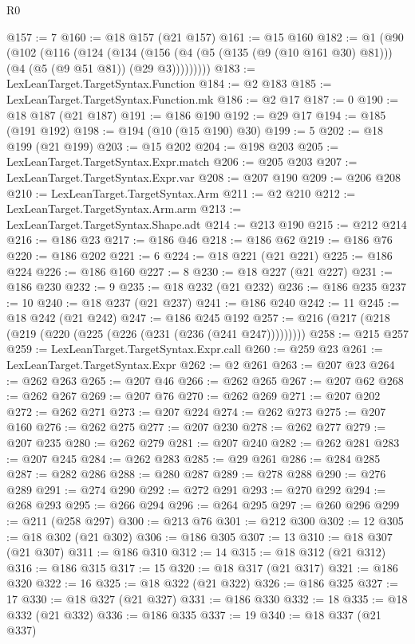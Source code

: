 \begin{lexlean}{R0}
\begin{coremodule}
@157 := 7
@160 := @18 @157 (@21 @157)
@161 := @15 @160
@182 := @1
    (@90
      (@102
        (@116
          (@124
            (@134
              (@156 (@4 (@5 (@135 (@9 (@10 @161 @30) @81))) (@4 (@5 (@9 @51 @81)) (@29 @3)))))))))
@183 := LexLeanTarget.TargetSyntax.Function
@184 := @2 @183
@185 := LexLeanTarget.TargetSyntax.Function.mk
@186 := @2 @17
@187 := 0
@190 := @18 @187 (@21 @187)
@191 := @186 @190
@192 := @29 @17
@194 := @185 (@191 @192)
@198 := @194 (@10 (@15 @190) @30)
@199 := 5
@202 := @18 @199 (@21 @199)
@203 := @15 @202
@204 := @198 @203
@205 := LexLeanTarget.TargetSyntax.Expr.match
@206 := @205 @203
@207 := LexLeanTarget.TargetSyntax.Expr.var
@208 := @207 @190
@209 := @206 @208
@210 := LexLeanTarget.TargetSyntax.Arm
@211 := @2 @210
@212 := LexLeanTarget.TargetSyntax.Arm.arm
@213 := LexLeanTarget.TargetSyntax.Shape.adt
@214 := @213 @190
@215 := @212 @214
@216 := @186 @23
@217 := @186 @46
@218 := @186 @62
@219 := @186 @76
@220 := @186 @202
@221 := 6
@224 := @18 @221 (@21 @221)
@225 := @186 @224
@226 := @186 @160
@227 := 8
@230 := @18 @227 (@21 @227)
@231 := @186 @230
@232 := 9
@235 := @18 @232 (@21 @232)
@236 := @186 @235
@237 := 10
@240 := @18 @237 (@21 @237)
@241 := @186 @240
@242 := 11
@245 := @18 @242 (@21 @242)
@247 := @186 @245 @192
@257 := @216 (@217 (@218 (@219 (@220 (@225 (@226 (@231 (@236 (@241 @247)))))))))
@258 := @215 @257
@259 := LexLeanTarget.TargetSyntax.Expr.call
@260 := @259 @23
@261 := LexLeanTarget.TargetSyntax.Expr
@262 := @2 @261
@263 := @207 @23
@264 := @262 @263
@265 := @207 @46
@266 := @262 @265
@267 := @207 @62
@268 := @262 @267
@269 := @207 @76
@270 := @262 @269
@271 := @207 @202
@272 := @262 @271
@273 := @207 @224
@274 := @262 @273
@275 := @207 @160
@276 := @262 @275
@277 := @207 @230
@278 := @262 @277
@279 := @207 @235
@280 := @262 @279
@281 := @207 @240
@282 := @262 @281
@283 := @207 @245
@284 := @262 @283
@285 := @29 @261
@286 := @284 @285
@287 := @282 @286
@288 := @280 @287
@289 := @278 @288
@290 := @276 @289
@291 := @274 @290
@292 := @272 @291
@293 := @270 @292
@294 := @268 @293
@295 := @266 @294
@296 := @264 @295
@297 := @260 @296
@299 := @211 (@258 @297)
@300 := @213 @76
@301 := @212 @300
@302 := 12
@305 := @18 @302 (@21 @302)
@306 := @186 @305
@307 := 13
@310 := @18 @307 (@21 @307)
@311 := @186 @310
@312 := 14
@315 := @18 @312 (@21 @312)
@316 := @186 @315
@317 := 15
@320 := @18 @317 (@21 @317)
@321 := @186 @320
@322 := 16
@325 := @18 @322 (@21 @322)
@326 := @186 @325
@327 := 17
@330 := @18 @327 (@21 @327)
@331 := @186 @330
@332 := 18
@335 := @18 @332 (@21 @332)
@336 := @186 @335
@337 := 19
@340 := @18 @337 (@21 @337)

\end{coremodule}
\end{lexlean}
